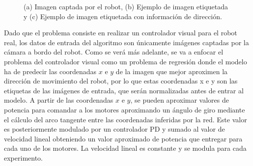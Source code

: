 \begin{figure}
	\begin{center}
		\hspace{0.1cm}
		\hspace{0.1cm}
	\end{center}
	\centering
	\captionsetup{justification=centering,margin=2cm}
	\caption{(a) Imagen captada por el robot, (b) Ejemplo de imagen etiquetada y (c) Ejemplo de imagen etiquetada con información de dirección.}
	\label{fig:dataexample}
\end{figure}

Dado que el problema consiste en realizar un controlador visual para el robot real, los datos de entrada del algoritmo son únicamente imágenes captadas por la cámara a bordo del robot. Como se verá más adelante, se va a enfocar el problema del controlador visual como un problema de regresión donde el modelo ha de predecir las coordenadas $x$ e $y$ de la imagen que mejor aproximen la dirección de movimiento del robot, por lo que estas coordenadas x e y son las etiquetas de las imágenes de entrada, que serán normalizadas antes de entrar al modelo. A partir de las coordenadas $x$ e $y$, se pueden aproximar valores de potencia para comandar a los motores aproximando un ángulo de giro mediante el cálculo del arco tangente entre las coordenadas inferidas por la red. Este valor es posteriormente modulado por un controlador PD y sumado al valor de velocidad lineal obteniendo un valor aproximado de potencia que entregar para cada uno de los motores. La velocidad lineal es constante y se modula para cada experimento.

